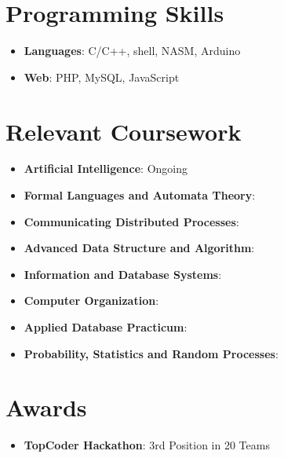 \documentclass[letterpaper,11pt]{article}
\newcommand{\resumeItem}[2]{
  \item\small{
    \textbf{#1}{: #2 \vspace{-2pt}}
  }
}
\newcommand{\resumeSubItem}[2]{\resumeItem{#1}{#2}\vspace{-4pt}}
\newcommand{\resumeSubHeadingListStart}{\begin{itemize}[leftmargin=*]}
\newcommand{\resumeSubHeadingListEnd}{\end{itemize}}
\begin{document}
\section{Programming Skills}
\resumeSubHeadingListStart
    \resumeSubItem{Languages}
      {C/C++, shell, NASM, Arduino}
    \resumeSubItem{Web}
      {PHP, MySQL, JavaScript}
  \resumeSubHeadingListEnd
  
\section{Relevant Coursework}
  \resumeSubHeadingListStart

    \resumeSubItem
      {Artificial Intelligence}{Ongoing}
     \resumeSubItem
      {Formal Languages and Automata Theory}{}
    \resumeSubItem
      {Communicating Distributed Processes}{}
      \resumeSubItem
      {Advanced Data Structure and Algorithm}{}
      \resumeSubItem
      {Information and Database Systems}{}
      \resumeSubItem
      {Computer Organization}{}
      \resumeSubItem
      {Applied Database Practicum}{}
      \resumeSubItem
      {Probability, Statistics and Random Processes}{}
    

  \resumeSubHeadingListEnd

\section{Awards}
  \resumeSubHeadingListStart

    \resumeSubItem
    {TopCoder Hackathon}{3rd Position in 20 Teams}

 \resumeSubHeadingListEnd

\end{document}
